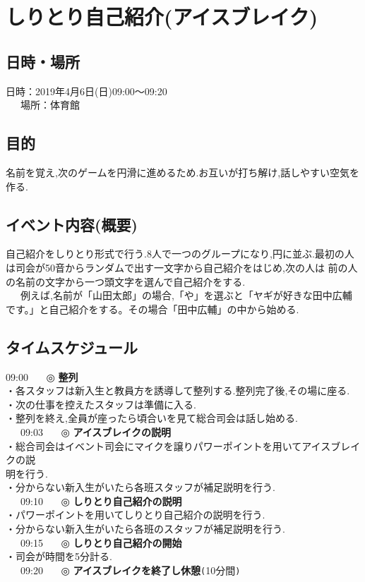 \section{しりとり自己紹介(アイスブレイク)}
\subsection{日時・場所}
日時：2019年4月6日(日)09:00〜09:20\\
\ \ \ 場所：体育館\\
\subsection{目的}
名前を覚え,次のゲームを円滑に進めるため.お互いが打ち解け,話しやすい空気を作る.
\subsection{イベント内容(概要)}
自己紹介をしりとり形式で行う.8人で一つのグループになり,円に並ぶ.最初の人は司会が50音からランダムで出す一文字から自己紹介をはじめ,次の人は
前の人の名前の文字から一つ頭文字を選んで自己紹介をする.\\
\ \ \ 例えば,名前が「山田太郎」の場合,「や」を選ぶと「ヤギが好きな田中広輔です。」と自己紹介をする。その場合「田中広輔」の中から始める.
\subsection{タイムスケジュール}
09:00 \ \ \ ◎ \textbf{整列} \\
\hspace{15mm}・各スタッフは新入生と教員方を誘導して整列する.整列完了後,その場に座る.\\
\hspace{15mm}・次の仕事を控えたスタッフは準備に入る.\\
\hspace{15mm}・整列を終え,全員が座ったら頃合いを見て総合司会は話し始める.\\
\ \ \ 09:03 \ \ \ ◎ \textbf{アイスブレイクの説明}\\
\hspace{15mm}・総合司会はイベント司会にマイクを譲りパワーポイントを用いてアイスブレイクの説\\
\hspace{15mm}明を行う.\\
\hspace{15mm}・分からない新入生がいたら各班スタッフが補足説明を行う.\\
\ \ \ 09:10 \ \ \ ◎ \textbf{しりとり自己紹介の説明}\\
\hspace{15mm}・パワーポイントを用いてしりとり自己紹介の説明を行う.\\
\hspace{15mm}・分からない新入生がいたら各班のスタッフが補足説明を行う.\\
\ \ \ 09:15 \ \ \ ◎ \textbf{しりとり自己紹介の開始}\\
\hspace{15mm}・司会が時間を5分計る.\\
\ \ \ 09:20 \ \ \ ◎ \textbf{アイスブレイクを終了し休憩}\verb+(+10分間\verb+)+
